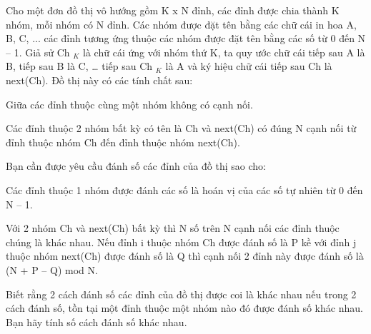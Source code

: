 Cho một đơn đồ thị vô hướng gồm K x N đỉnh, các đỉnh được chia thành K nhóm, mỗi nhóm có N đỉnh. Các nhóm được đặt tên bằng các chữ cái in hoa A, B, C, ... các đỉnh tương ứng thuộc các nhóm được đặt tên bằng các số từ 0 đến N – 1. Giả sử Ch   $_    K   $   là chữ cái ứng với nhóm thứ K, ta quy ước chữ cái tiếp sau A là B, tiếp sau B là C, … tiếp sau Ch   $_    K   $   là A và ký hiệu chữ cái tiếp sau Ch là next(Ch). Đồ thị này có các tính chất sau:  

   Giữa các đỉnh thuộc cùng một nhóm không có cạnh nối.  

   Các đỉnh thuộc 2 nhóm bất kỳ có tên là Ch và next(Ch) có đúng N cạnh nối từ đỉnh thuộc nhóm Ch đến đỉnh thuộc nhóm next(Ch).  

   Bạn cần được yêu cầu đánh số các đỉnh của đồ thị sao cho:  

   Các đỉnh thuộc 1 nhóm được đánh các số là hoán vị của các số tự nhiên từ 0 đến N – 1.  

   Với 2 nhóm Ch và next(Ch) bất kỳ thì N số trên N cạnh nối các đỉnh thuộc chúng là khác nhau. Nếu đỉnh i thuộc nhóm Ch được đánh số là P kề với đỉnh j thuộc nhóm next(Ch) được đánh số là Q thì cạnh nối 2 đỉnh này được đánh số là (N + P – Q) mod N.  

   Biết rằng 2 cách đánh số các đỉnh của đồ thị được coi là khác nhau nếu trong 2 cách đánh số, tồn tại một đỉnh thuộc một nhóm nào đó được đánh số khác nhau. Bạn hãy tính số cách đánh số khác nhau.